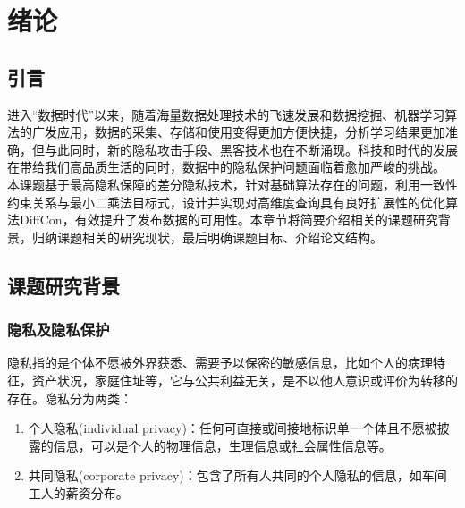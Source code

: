 
\chapter{绪论}
\label{chap:introduction}

\section{引言}
\label{sec:objective}
进入“数据时代”以来，随着海量数据处理技术的飞速发展和数据挖掘、机器学习算法的广发应用，数据的采集、存储和使用变得更加方便快捷，分析学习结果更加准确，但与此同时，新的隐私攻击手段、黑客技术也在不断涌现。科技和时代的发展在带给我们高品质生活的同时，数据中的隐私保护问题面临着愈加严峻的挑战。
本课题基于最高隐私保障的差分隐私技术，针对基础算法存在的问题，利用一致性约束关系与最小二乘法目标式，设计并实现对高维度查询具有良好扩展性的优化算法DiffCon，有效提升了发布数据的可用性。本章节将简要介绍相关的课题研究背景，归纳课题相关的研究现状，最后明确课题目标、介绍论文结构。


\section{课题研究背景}

\subsection{隐私及隐私保护}  %

隐私指的是个体不愿被外界获悉、需要予以保密的敏感信息，比如个人的病理特征，资产状况，家庭住址等，它与公共利益无关，是不以他人意识或评价为转移的存在。隐私分为两类\supercite{Defining-Privacy-for-Data}：
\begin{enumerate}
	\item 个人隐私(individual privacy)：任何可直接或间接地标识单一个体且不愿被披露的信息，可以是个人的物理信息，生理信息或社会属性信息等。
	\item 共同隐私(corporate privacy)：包含了所有人共同的个人隐私的信息，如车间工人的薪资分布。
\end{enumerate}

